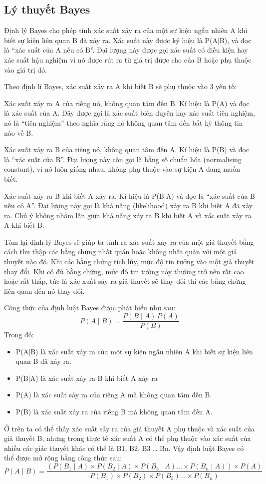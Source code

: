 \subsection{Lý thuyết Bayes}
    Định lý Bayes cho phép tính xác suất xảy ra của một sự kiện ngẫu nhiên A khi biết sự kiện liên quan B đã xảy ra. Xác suất này được ký hiệu là P(A|B), và đọc là “xác suất của A nếu có B”. Đại lượng này được gọi xác suất có điều kiện hay xác suất hậu nghiệm vì nó được rút ra từ giá trị được cho của B hoặc phụ thuộc vào giá trị đó.

	Theo định lí Bayes, xác suất xảy ra A khi biết B sẽ phụ thuộc vào 3 yếu tố:
	
	Xác suất xảy ra A của riêng nó, không quan tâm đến B. Kí hiệu là P(A) và đọc là xác suất của A. Đây được gọi là xác suất biên duyên hay xác suất tiên nghiệm, nó là “tiên nghiệm” theo nghĩa rằng nó không quan tâm đến bất kỳ thông tin nào về B.
	
	Xác suất xảy ra B của riêng nó, không quan tâm đến A. Kí hiệu là P(B) và đọc là “xác suất của B”. Đại lượng này còn gọi là hằng số chuẩn hóa (normalising constant), vì nó luôn giống nhau, không phụ thuộc vào sự kiện A đang muốn biết.
	
	Xác suất xảy ra B khi biết A xảy ra. Kí hiệu là P(B|A) và đọc là “xác suất của B nếu có A”. Đại lượng này gọi là khả năng (likelihood) xảy ra B khi biết A đã xảy ra. Chú ý không nhầm lẫn giữa khả năng xảy ra B khi biết A và xác suất xảy ra A khi biết B.
	
	Tóm lại định lý Bayes sẽ giúp ta tính ra xác suất xảy ra của một giả thuyết bằng cách thu thập các bằng chứng nhất quán hoặc không nhất quán với một giả thuyết nào đó. Khi các bằng chứng tích lũy, mức độ tin tưởng vào một giả thuyết thay đổi. Khi có đủ bằng chứng, mức độ tin tưởng này thường trở nên rất cao hoặc rất thấp, tức là xác xuất sảy ra giả thuyết sẽ thay đổi thì các bằng chứng liên quan đến nó thay đổi.
	
	Công thức của định luật Bayes được phát biểu như sau:
\begin{equation}
	P(A \mid B) = \frac{P(B \mid A) \, P(A)}{P(B)}
\end{equation}
Trong đó:
\begin{itemize}
	\item P(A|B) là  xác suất xảy ra của một sự kiện ngẫu nhiên A khi biết sự kiện liên quan B đã xảy ra.
	\item P(B|A) là xác suất xảy ra B khi biết A xảy ra
	\item P(A) là xác suất sảy ra của riêng A mà không quan tâm đến B.
	\item P(B) là xác suất xảy ra của riêng B mà không quan tâm đến A.
\end{itemize}
	Ở trên ta có thể thấy xác suất sảy ra của giả thuyết A phụ thuộc và xác suất của giả thuyết B, nhưng trong thực tế xác suất A có thể phụ thuộc vào xác suất của nhiều các giác thuyết khác có thể là B1, B2, B3 … Bn. Vậy định luật Bayes có thể được mở rộng bằng công thức sau:
\begin{equation}
	P(A \mid B) = \frac{\left(P(B_1 \mid A) \times P(B_2 \mid A) \times P(B_3 \mid A)... \times P(B_n \mid A)\right) \times P(A)}{P(B_1) \times P(B_2) \times P(B_3)... \times P(B_n)}
\end{equation}
